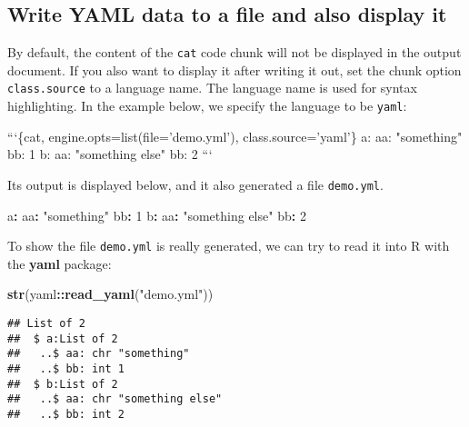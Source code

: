 \documentclass[
  11pt,
]{krantz}
\newenvironment{Shaded}{\begin{snugshade}}{\end{snugshade}}
\newcommand{\AttributeTok}[1]{\textcolor[rgb]{0.61,0.61,0.61}{#1}}
\newcommand{\BaseNTok}[1]{\textcolor[rgb]{0.06,0.06,0.06}{#1}}
\newcommand{\DecValTok}[1]{\textcolor[rgb]{0.06,0.06,0.06}{#1}}
\newcommand{\FunctionTok}[1]{\textcolor[rgb]{0,0,0}{#1}}
\newcommand{\KeywordTok}[1]{\textcolor[rgb]{0.27,0.27,0.27}{\textbf{#1}}}
\newcommand{\NormalTok}[1]{#1}
\newcommand{\OperatorTok}[1]{\textcolor[rgb]{0.43,0.43,0.43}{\textbf{#1}}}
\newcommand{\StringTok}[1]{\textcolor[rgb]{0.5,0.5,0.5}{#1}}
\begin{document}
\hypertarget{write-yaml-data-to-a-file-and-also-display-it}{%
\subsection{Write YAML data to a file and also display it}\label{write-yaml-data-to-a-file-and-also-display-it}}

By default, the content of the \texttt{cat} code chunk will not be displayed in the output document. If you also want to display it after writing it out, set the chunk option \texttt{class.source} to a language name. The language name is used for syntax highlighting. In the example below, we specify the language to be \texttt{yaml}:

\begin{Shaded}
\begin{Highlighting}[]
\BaseNTok{```\{cat, engine.opts=list(file='demo.yml'), class.source='yaml'\}}
\BaseNTok{a:}
\BaseNTok{  aa: "something"}
\BaseNTok{  bb: 1}
\BaseNTok{b:}
\BaseNTok{  aa: "something else"}
\BaseNTok{  bb: 2}
\BaseNTok{```}
\end{Highlighting}
\end{Shaded}

Its output is displayed below, and it also generated a file \texttt{demo.yml}.

\begin{Shaded}
\begin{Highlighting}[]
\FunctionTok{a}\KeywordTok{:}
\AttributeTok{  }\FunctionTok{aa}\KeywordTok{:}\AttributeTok{ }\StringTok{"something"}
\AttributeTok{  }\FunctionTok{bb}\KeywordTok{:}\AttributeTok{ }\DecValTok{1}
\FunctionTok{b}\KeywordTok{:}
\AttributeTok{  }\FunctionTok{aa}\KeywordTok{:}\AttributeTok{ }\StringTok{"something else"}
\AttributeTok{  }\FunctionTok{bb}\KeywordTok{:}\AttributeTok{ }\DecValTok{2}
\end{Highlighting}
\end{Shaded}

To show the file \texttt{demo.yml} is really generated, we can try to read it into R with the \textbf{yaml} package:

\begin{Shaded}
\begin{Highlighting}[]
\KeywordTok{str}\NormalTok{(yaml}\OperatorTok{::}\KeywordTok{read_yaml}\NormalTok{(}\StringTok{"demo.yml"}\NormalTok{))}
\end{Highlighting}
\end{Shaded}

\begin{verbatim}
## List of 2
##  $ a:List of 2
##   ..$ aa: chr "something"
##   ..$ bb: int 1
##  $ b:List of 2
##   ..$ aa: chr "something else"
##   ..$ bb: int 2
\end{verbatim}
\end{document}
